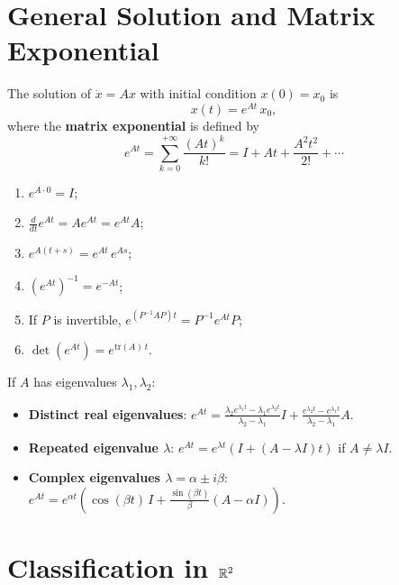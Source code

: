\section{General Solution and Matrix Exponential}

\begin{theorem}
The solution of $\dot{x} = Ax$ with initial condition $x(0) = x_0$ is
\[
    x(t) = e^{At}\, x_0,
\]
where the \textbf{matrix exponential} is defined by
\[
    e^{At} = \sum_{k=0}^{+\infty} \frac{(At)^k}{k!} = I + At + \frac{A^2 t^2}{2!} + \cdots
\]
\end{theorem}

\begin{proposition}[Properties of $e^{At}$]
\begin{enumerate}
    \item $e^{A \cdot 0} = I$;
    \item $\frac{d}{dt} e^{At} = A e^{At} = e^{At} A$;
    \item $e^{A(t+s)} = e^{At}\, e^{As}$;
    \item $(e^{At})^{-1} = e^{-At}$;
    \item If $P$ is invertible, $e^{(P^{-1}AP)t} = P^{-1} e^{At} P$;
    \item $\det(e^{At}) = e^{\mathrm{tr}(A)\, t}$.
\end{enumerate}
\end{proposition}

\begin{keyformulas}[title=\textbf{Computing $e^{At}$ for $A \in \R^{2 \times 2}$}]
If $A$ has eigenvalues $\lambda_1, \lambda_2$:
\begin{itemize}
    \item \textbf{Distinct real eigenvalues}:
    $e^{At} = \frac{\lambda_2 e^{\lambda_1 t} - \lambda_1 e^{\lambda_2 t}}{\lambda_2 - \lambda_1} I
    + \frac{e^{\lambda_2 t} - e^{\lambda_1 t}}{\lambda_2 - \lambda_1} A$.
    \item \textbf{Repeated eigenvalue $\lambda$}:
    $e^{At} = e^{\lambda t}(I + (A - \lambda I)t)$ if $A \neq \lambda I$.
    \item \textbf{Complex eigenvalues $\lambda = \alpha \pm i\beta$}:
    $e^{At} = e^{\alpha t}\left(\cos(\beta t)\, I + \frac{\sin(\beta t)}{\beta}(A - \alpha I)\right)$.
\end{itemize}
\end{keyformulas}

\section{Classification in $\mathbb{R}^2$}

